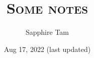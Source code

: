 \documentclass[12pt,oneside,reqno]{amsart}
\title{\textsc{Some notes}}
\author{Sapphire Tam}
\date{Aug 17, 2022 (last updated)}
\theoremstyle{plain}
\theoremstyle{remark}
\begin{document}
\maketitle

% 
% 
% 
% 



% 



{}

\end{document}

